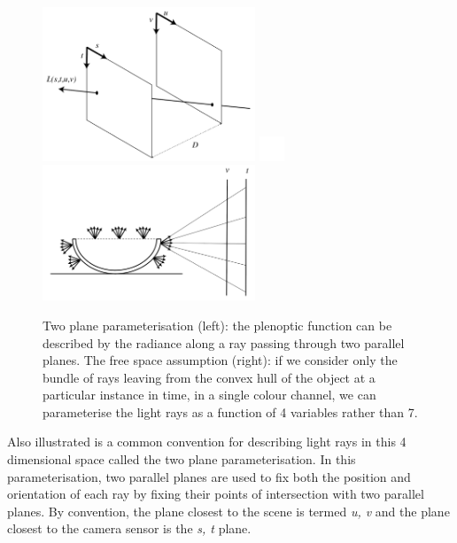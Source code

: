 \documentclass[openany]{book}
\begin{document}
\begin{figure}[htbp]
    \centering
    \includegraphics[width=2.5in]{images/2pp.png}
    \includegraphics[width=0.3in]{images/blank.png}
    \includegraphics[width=2.5in]{images/convexhull.png}
    
    \caption{Two plane parameterisation (left): the plenoptic function can be described by the radiance along a ray passing through two parallel planes. The free space assumption (right): if we consider only the bundle of rays leaving from the convex hull of the object at a particular instance in time, in a single colour channel, we can parameterise the light rays as a function of 4 variables rather than 7.}
    
    \label{convexhull}
\end{figure}

Also illustrated is a common convention for describing light rays in this 4 dimensional space called the two plane parameterisation. In this parameterisation, two parallel planes are used to fix both the position and orientation of each ray by fixing their points of intersection with two parallel planes. By convention, the plane closest to the scene is termed \textit{u, v} and the plane closest to the camera sensor is the \textit{s, t} plane.
\end{document}
